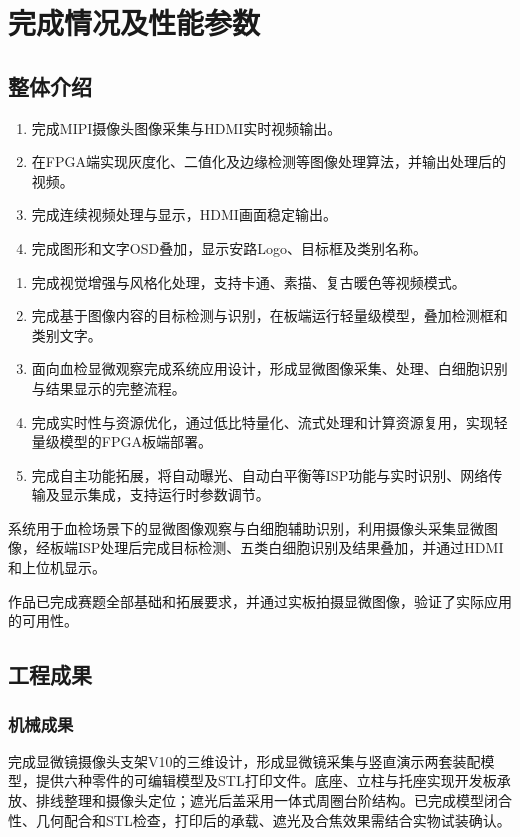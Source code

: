 \section{完成情况及性能参数}
\subsection{整体介绍}
\begin{enumerate}
\item 完成MIPI摄像头图像采集与HDMI实时视频输出。
\item 在FPGA端实现灰度化、二值化及边缘检测等图像处理算法，并输出处理后的视频。
\item 完成连续视频处理与显示，HDMI画面稳定输出。
\item 完成图形和文字OSD叠加，显示安路Logo、目标框及类别名称。
\end{enumerate}

\begin{enumerate}
\item 完成视觉增强与风格化处理，支持卡通、素描、复古暖色等视频模式。
\item 完成基于图像内容的目标检测与识别，在板端运行轻量级模型，叠加检测框和类别文字。
\item 面向血检显微观察完成系统应用设计，形成显微图像采集、处理、白细胞识别与结果显示的完整流程。
\item 完成实时性与资源优化，通过低比特量化、流式处理和计算资源复用，实现轻量级模型的FPGA板端部署。
\item 完成自主功能拓展，将自动曝光、自动白平衡等ISP功能与实时识别、网络传输及显示集成，支持运行时参数调节。
\end{enumerate}

系统用于血检场景下的显微图像观察与白细胞辅助识别，利用摄像头采集显微图像，经板端ISP处理后完成目标检测、五类白细胞识别及结果叠加，并通过HDMI和上位机显示。

作品已完成赛题全部基础和拓展要求，并通过实板拍摄显微图像，验证了实际应用的可用性。

\subsection{工程成果}
\subsubsection{机械成果}
完成显微镜摄像头支架V10的三维设计，形成显微镜采集与竖直演示两套装配模型，提供六种零件的可编辑模型及STL打印文件。底座、立柱与托座实现开发板承放、排线整理和摄像头定位；遮光后盖采用一体式周圈台阶结构。已完成模型闭合性、几何配合和STL检查，打印后的承载、遮光及合焦效果需结合实物试装确认。\cite{mechanical}

